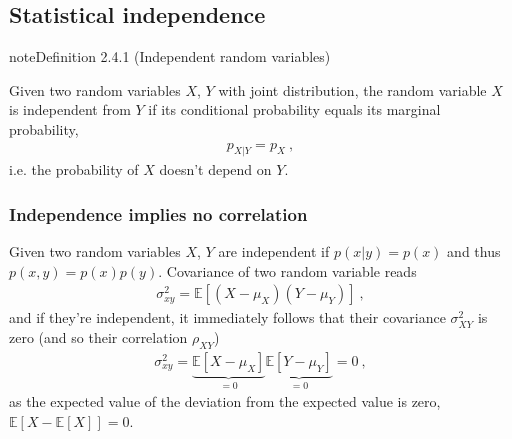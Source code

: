 \documentclass[letterpaper,10pt,english]{jupyterBook}
\begin{document}
\subsection{Statistical independence}
\label{\detokenize{ch/prob/rv-multi-dimensional:statistical-independence}}\label{\detokenize{ch/prob/rv-multi-dimensional:prob-multidim-independence}}\label{ch/prob/rv-multi-dimensional:definition-2}
\begin{sphinxadmonition}{note}{Definition 2.4.1 (Independent random variables)}



\sphinxAtStartPar
Given two random variables \(X\), \(Y\) with joint distribution, the random variable \(X\) is independent from \(Y\) if its conditional probability equals its marginal probability,
\begin{equation*}
\begin{split}p_{X|Y} = p_X \ ,\end{split}
\end{equation*}
\sphinxAtStartPar
i.e. the probability of \(X\) doesn’t depend on \(Y\).
\end{sphinxadmonition}


\subsubsection{Independence implies no correlation}
\label{\detokenize{ch/prob/rv-multi-dimensional:independence-implies-no-correlation}}\label{\detokenize{ch/prob/rv-multi-dimensional:prob-multidim-independence-no-correlation}}
\sphinxAtStartPar
Given two random variables \(X\), \(Y\) are independent if \(p(x|y) = p(x)\) and thus \(p(x,y) = p(x) p(y)\). Covariance of two random variable reads
\begin{equation*}
\begin{split}\sigma^2_{xy} = \mathbb{E} \left[ (X - \mu_X) (Y - \mu_Y)  \right] \ ,\end{split}
\end{equation*}
\sphinxAtStartPar
and if they’re independent, it immediately follows that their covariance \(\sigma^2_{XY}\) is zero (and so their correlation \(\rho_{XY}\))
\begin{equation*}
\begin{split}\sigma^2_{xy} = \underbrace{\mathbb{E} \left[ X - \mu_X \right]}_{=0} \underbrace{\mathbb{E} \left[ Y - \mu_Y \right]}_{=0} = 0 \ ,\end{split}
\end{equation*}
\sphinxAtStartPar
as the expected value of the deviation from the expected value is zero, \(\mathbb{E} \left[ X - \mathbb{E}[X] \right] = 0\).
\end{document}
